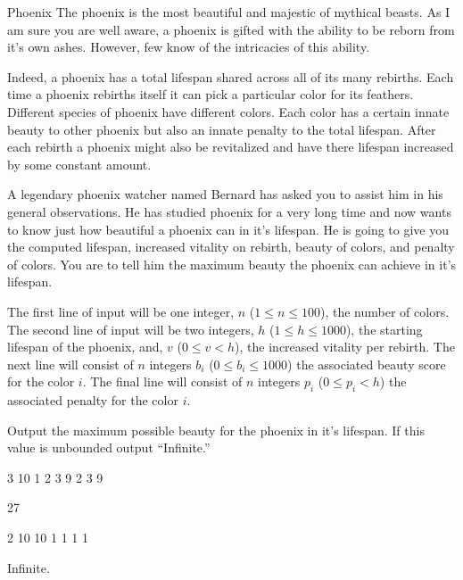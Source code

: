 \begin{problem}{Phoenix}
The phoenix is the most beautiful and majestic of mythical beasts.
As I am sure you are well aware, a phoenix is gifted with the ability to be reborn from it's own ashes.
However, few know of the intricacies of this ability.

Indeed, a phoenix has a total lifespan shared across all of its many rebirths.
Each time a phoenix rebirths itself it can pick a particular color for its feathers.
Different species of phoenix have different colors.
Each color has a certain innate beauty to other phoenix but also an innate penalty to the total lifespan.
After each rebirth a phoenix might also be revitalized and have there lifespan increased by some constant amount.

A legendary phoenix watcher named Bernard has asked you to assist him in his general observations.
He has studied phoenix for a very long time and now wants to know just how beautiful a phoenix can in it's lifespan.
He is going to give you the computed lifespan, increased vitality on rebirth, beauty of colors, and penalty of colors.
You are to tell him the maximum beauty the phoenix can achieve in it's lifespan.
\end{problem}

\begin{formalin}
The first line of input will be one integer, $n$ ($1 \leq n \leq 100$), the number of colors.
The second line of input will be two integers, $h$ ($1 \leq h \leq 1000$), the starting lifespan of the phoenix, and, $v$ ($0 \leq v < h$), the increased vitality per rebirth.
The next line will consist of $n$ integers $b_i$ ($0 \leq b_i \leq 1000$) the associated beauty score for the color $i$.
The final line will consist of $n$ integers $p_i$ ($0 \leq p_i < h$) the associated penalty for the color $i$.
\end{formalin}

\begin{formalout}
Output the maximum possible beauty for the phoenix in it's lifespan.
If this value is unbounded output ``Infinite.''
\end{formalout}

\begin{datain}
3
10 1
2 3 9
2 3 9
\end{datain}
\begin{dataout}
27
\end{dataout}

\begin{datain}
2
10 10
1 1
1 1
\end{datain}
\begin{dataout}
Infinite.
\end{dataout}
